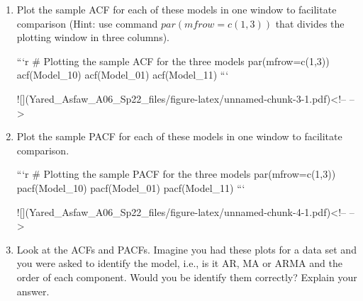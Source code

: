 \documentclass[
]{article}
\begin{document}
\begin{enumerate}[label=(\alph*)]

\item Plot the sample ACF for each of these models in one window to facilitate comparison (Hint: use command $par(mfrow=c(1,3))$ that divides the plotting window in three columns).  


```r
# Plotting the sample ACF for the three models
par(mfrow=c(1,3))
acf(Model_10)
acf(Model_01)
acf(Model_11)
```

![](Yared_Asfaw_A06_Sp22_files/figure-latex/unnamed-chunk-3-1.pdf)<!-- --> 


\item Plot the sample PACF for each of these models in one window to facilitate comparison.  


```r
# Plotting the sample PACF for the three models
par(mfrow=c(1,3))
pacf(Model_10)
pacf(Model_01)
pacf(Model_11)
```

![](Yared_Asfaw_A06_Sp22_files/figure-latex/unnamed-chunk-4-1.pdf)<!-- --> 
                                                          
\item Look at the ACFs and PACFs. Imagine you had these plots for a data set and you were asked to identify the model, i.e., is it AR, MA or ARMA and the order of each component. Would you be identify them correctly? Explain your answer.


\end{enumerate}
\end{document}
